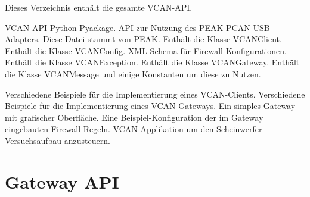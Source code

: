 \begin{description}
    Dieses Verzeichnis enthält die gesamte VCAN-API.
    \begin{description}
        VCAN-API Python Pyackage.
        API zur Nutzung des PEAK-PCAN-USB-Adapters. Diese Datei stammt von PEAK.
        Enthält die Klasse VCANClient.
        Enthält die Klasse VCANConfig.
        XML-Schema für Firewall-Konfigurationen.
        Enthält die Klasse VCANException.
        Enthält die Klasse VCANGateway.
        Enthält die Klasse VCANMessage und einige Konstanten um diese zu Nutzen.
    \end{description}
    Verschiedene Beispiele für die Implementierung eines VCAN-Clients.
    Verschiedene Beispiele für die Implementierung eines VCAN-Gateways.
    Ein simples Gateway mit grafischer Oberfläche.
    Eine Beispiel-Konfiguration der im Gateway eingebauten Firewall-Regeln.
    VCAN Applikation um den Scheinwerfer-Versuchsaufbau anzusteuern.
\end{description}


\section{Gateway API}
\label{sec:vcan_gateway_api}

